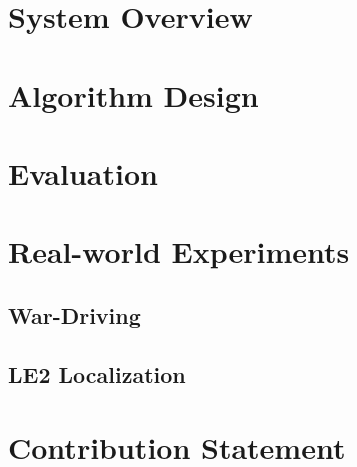 \section{System Overview}


\section{Algorithm Design}

\section{Evaluation}


\section{Real-world Experiments}

\subsection{War-Driving}

\subsection{LE2 Localization}


\section{Contribution Statement}